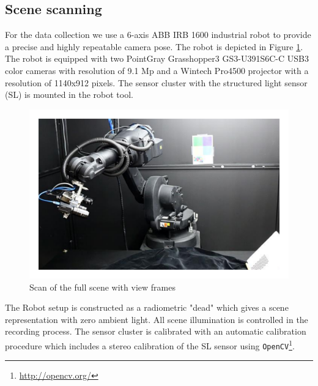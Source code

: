 \documentclass[10pt,twocolumn,letterpaper]{article}
\begin{document}
\subsection{Scene scanning} 
For the data collection we use a 6-axis ABB IRB 1600 industrial robot to provide a precise and highly repeatable camera pose. The robot is depicted in Figure \ref{fig:robot}. The robot is equipped with two PointGray Grasshopper3 GS3-U391S6C-C USB3 color cameras with resolution of 9.1 Mp and a Wintech Pro4500 projector with a resolution of 1140x912 pixels. The sensor cluster with the structured light sensor (SL) is mounted in the robot tool. 
\begin{figure}[ht]
\centering
\includegraphics[width=1.0\linewidth, height= 0.7\linewidth]{Robot.pdf}
\caption{Scan of the full scene with view frames}
\label{fig:robot}
\end{figure}
The Robot setup is constructed as a radiometric "dead" which gives a scene representation with zero ambient light. All scene illumination is controlled in the recording process. The sensor cluster is calibrated with an automatic calibration procedure which includes a stereo calibration of the SL sensor using \verb|OpenCV|\footnote{\url{http://opencv.org/}}.%
\end{document}
